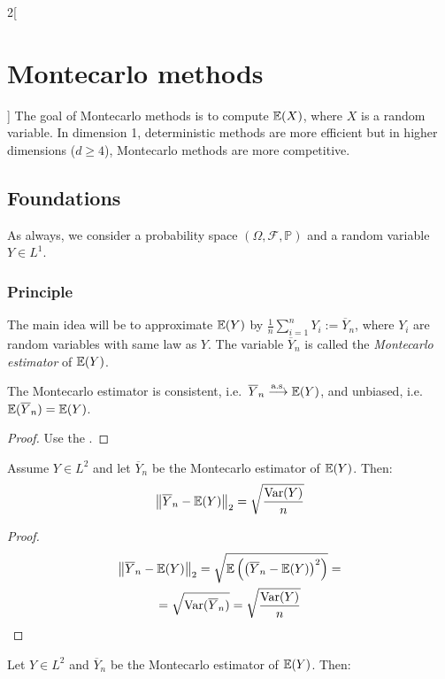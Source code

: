 \documentclass[../../../main_math.tex]{subfiles}
\begin{document}
\begin{multicols}{2}[\section{Montecarlo methods}]
  The goal of Montecarlo methods is to compute $\mathbb{E}(X)$, where $X$ is a random variable. In dimension 1, deterministic methods are more efficient but in higher dimensions ($d\geq 4$), Montecarlo methods are more competitive.
  \subsection{Foundations}
  As always, we consider a probability space $(\Omega,\mathcal{F},\mathbb{P})$ and a random variable $Y\in L^1$.
  \subsubsection{Principle}
  \begin{definition}
    The main idea will be to approximate $\mathbb{E}(Y)$ by $\frac{1}{n}\sum_{i=1}^n Y_i:=\overline{Y}_n$, where $Y_i$ are \iid random variables with same law as $Y$. The variable $\overline{Y}_n$ is called the \emph{Montecarlo estimator} of $\mathbb{E}(Y)$.
  \end{definition}
  \begin{lemma}
    The Montecarlo estimator is consistent, i.e.\ $\overline{Y}_n\overset{\text{a.s.}}{\longrightarrow}\mathbb{E}(Y)$, and unbiased, i.e.\ $\mathbb{E}(\overline{Y}_n)=\mathbb{E}(Y)$.
  \end{lemma}
  \begin{proof}
    Use the .
  \end{proof}
  \begin{lemma}
    Assume $Y\in L^2$ and let $\overline{Y}_n$ be the Montecarlo estimator of $\mathbb{E}(Y)$. Then:
    $$
      \left\|\overline{Y}_n-\mathbb{E}(Y)\right\|_{2}=\sqrt{\frac{\mathrm{Var}(Y)}{n}}
    $$
  \end{lemma}
  \begin{proof}
    \begin{multline*}
      \left\|\overline{Y}_n-\mathbb{E}(Y)\right\|_{2}=\sqrt{\mathbb{E}\left(\left(\overline{Y}_n-\mathbb{E}(Y)\right)^2\right)}=\\=\sqrt{\mathrm{Var}(\overline{Y}_n)}=\sqrt{\frac{\mathrm{Var}(Y)}{n}}
    \end{multline*}
  \end{proof}
  \begin{lemma}
    Let $Y\in L^2$ and $\overline{Y}_n$ be the Montecarlo estimator of $\mathbb{E}(Y)$. Then:

\end{lemma}
\end{multicols}
\end{document}
